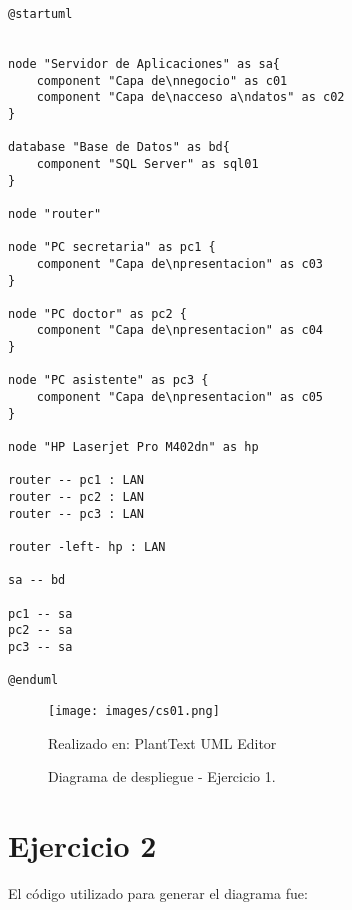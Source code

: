 \documentclass[a4paper,12pt]{article}
\begin{document}
\begin{lstlisting}
@startuml


node "Servidor de Aplicaciones" as sa{
    component "Capa de\nnegocio" as c01
    component "Capa de\nacceso a\ndatos" as c02
}

database "Base de Datos" as bd{
    component "SQL Server" as sql01
}

node "router"

node "PC secretaria" as pc1 {
    component "Capa de\npresentacion" as c03
}

node "PC doctor" as pc2 {
    component "Capa de\npresentacion" as c04
}

node "PC asistente" as pc3 {
    component "Capa de\npresentacion" as c05
}

node "HP Laserjet Pro M402dn" as hp

router -- pc1 : LAN
router -- pc2 : LAN
router -- pc3 : LAN

router -left- hp : LAN

sa -- bd

pc1 -- sa
pc2 -- sa
pc3 -- sa

@enduml
\end{lstlisting}

\begin{figure}[ht]
        \centering        
        \texttt{[image: images/cs01.png]}
        \caption{Diagrama de despliegue - Ejercicio 1.}  
        {{\footnotesize Realizado en: PlantText UML Editor }}
\end{figure}

\section*{Ejercicio 2}

El código utilizado para generar el diagrama fue:
\end{document}
